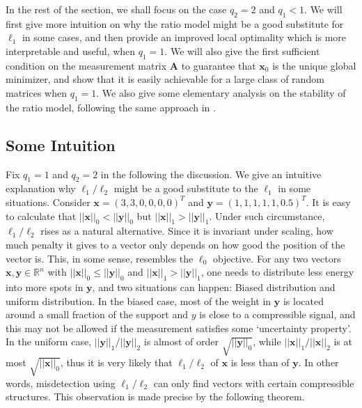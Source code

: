 \documentclass[11pt]{article}
\numberwithin{equation}{section}
\theoremstyle{plain}
\theoremstyle{definition}
\def\R{{\mathbb R}}
\def\R{{\mathbb R}}
\def\A{{\mathbf A}}
\def\x{{\mathbf x}}
\def\y{{\mathbf{y}}}
\begin{document}
In the rest of the section, we shall focus on the case $q_2=2$ and $q_1<1$.  We will first give more intuition on why the ratio model might be a good substitute for $\ell_1$ in some cases, and then provide an improved local optimality which is more interpretable and useful, when $q_1=1$. We will also give the first sufficient condition on the measurement matrix $\A$ to guarantee that $\x_0$ is the unique global minimizer, and show that it is easily achievable for a large class of random matrices when $q_1=1$. We also give some elementary analysis on the stability of the ratio model, following the same approach in \cite{zhang2013theory}.   

\subsection{Some Intuition}

Fix $q_1=1$ and $q_2=2$ in the following the discussion. We give an intuitive explanation why $\ell_1/\ell_2$ might be a good substitute to the $\ell_1$ in some situations. Consider $\x=(3,3,0,0,0,0)^T$ and $\y=(1,1,1,1,1,0.5)^T$. It is easy to calculate that $||\x||_0<||\y||_0$ but $||\x||_1>||\y||_1$. Under such circumstance, $\ell_1/\ell_2$ rises as a natural alternative. Since it is invariant under scaling, how much penalty it gives to a vector only depends on how good the position of the vector is. This, in some sense, resembles the $\ell_0$ objective. For any two vectors $\x, \y\in\R^n$ with $||\x||_0\leq ||\y||_0$ and $||\x||_1>||\y||_1$, one needs to distribute less energy into more spots in $\y$, and two situations can happen: Biased distribution and uniform distribution. In the biased case, most of the weight in $\y$ is located around a small fraction of the support and $y$ is close to a compressible signal, and this may not be allowed if the measurement satisfies some `uncertainty property'. In the uniform case, $||\y||_1/||\y||_2$ is almost of order $\sqrt{||\y||_0}$, while $||\x||_1/||\x||_2$ is at most $\sqrt{||\x||_0}$, thus it is very likely that $\ell_1/\ell_2$ of $\x$ is less than of $\y$. In other words, misdetection using $\ell_1/\ell_2$ can only find vectors with certain compressible structures. This observation is made precise by the following theorem.      
\end{document}

